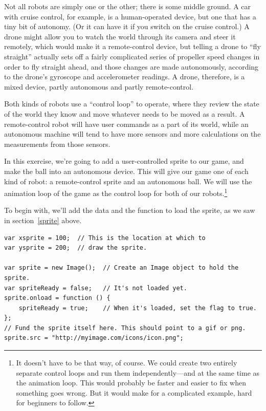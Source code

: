 \documentclass[11pt]{article}
\begin{document}
Not all robots are simply one or the other; there is some middle
ground.  A car with cruise control, for example, is a human-operated
device, but one that has a tiny bit of autonomy.  (Or it can have it
if you switch on the cruise control.)  A drone might allow you to
watch the world through its camera and steer it remotely, which would
make it a remote-control device, but telling a drone to ``fly
straight'' actually sets off a fairly complicated series of propeller
speed changes in order to fly straight ahead, and those changes are
made autonomously, according to the drone's gyroscope and
accelerometer readings.  A drone, therefore, is a mixed device, partly
autonomous and partly remote-control.

Both kinds of robots use a ``control loop'' to operate, where they
review the state of the world they know and move whatever needs to be
moved as a result.  A remote-control robot will have user commands as
a part of its world, while an autonomous machine will tend to have
more sensors and more calculations on the measurements from those
sensors.

In this exercise, we're going to add a user-controlled sprite to our
game, and make the ball into an autonomous device.  This will give our
game one of each kind of robot: a remote-control sprite and an
autonomous ball.  We will use the animation loop of the game as the
control loop for both of our robots.\footnote{It doesn't have to be that way,
of course.  We could create two entirely separate control loops and
run them independently---and at the same time as the animation loop.
This would probably be faster and easier to fix when something goes
wrong.  But it would make for a complicated example, hard for
beginners to follow.}

To begin with, we'll add the data and the function to load the sprite,
as we saw in section~\ref{sprite} above.

\begin{verbatim}
var xsprite = 100;  // This is the location at which to
var ysprite = 200;  // draw the sprite.

var sprite = new Image();  // Create an Image object to hold the sprite.
var spriteReady = false;   // It's not loaded yet.
sprite.onload = function () {
    spriteReady = true;    // When it's loaded, set the flag to true.
};
// Fund the sprite itself here. This should point to a gif or png.
sprite.src = "http://myimage.com/icons/icon.png";
\end{verbatim}
\end{document}

